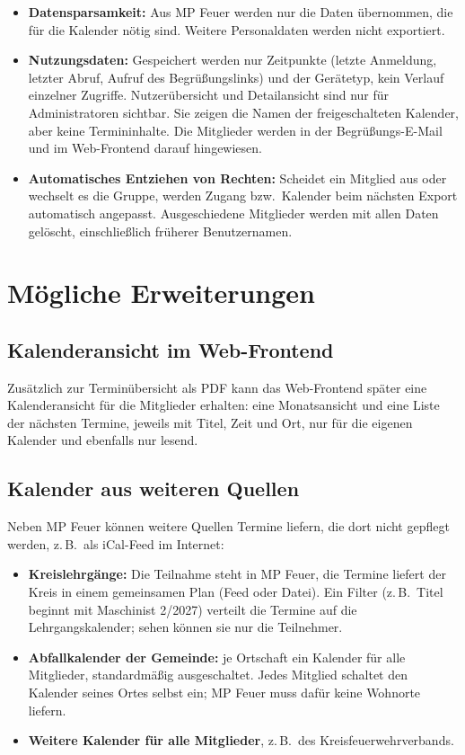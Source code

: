 \documentclass[a4paper,fontsize=10pt]{scrartcl}
\begin{document}
\begin{itemize}
  \item \textbf{Datensparsamkeit:} Aus MP Feuer werden nur die Daten
        übernommen, die für die Kalender nötig sind. Weitere
        Personaldaten werden nicht exportiert.
  \item \textbf{Nutzungsdaten:} Gespeichert werden nur Zeitpunkte (letzte
        Anmeldung, letzter Abruf, Aufruf des Begrüßungslinks) und der
        Gerätetyp, kein Verlauf einzelner Zugriffe. Nutzerübersicht und
        Detailansicht sind nur für Administratoren sichtbar. Sie zeigen die
        Namen der freigeschalteten Kalender, aber keine Termininhalte. Die Mitglieder werden in der
        Begrüßungs-E-Mail und im Web-Frontend darauf hingewiesen.
  \item \textbf{Automatisches Entziehen von Rechten:} Scheidet ein Mitglied
        aus oder wechselt es die Gruppe, werden Zugang bzw.\ Kalender beim
        nächsten Export automatisch angepasst. Ausgeschiedene Mitglieder
        werden mit allen Daten gelöscht, einschließlich früherer
        Benutzernamen.
\end{itemize}

\section{Mögliche Erweiterungen}

\subsection*{Kalenderansicht im Web-Frontend}

Zusätzlich zur Terminübersicht als PDF kann das Web-Frontend später eine
Kalenderansicht für die Mitglieder erhalten: eine Monatsansicht und eine
Liste der nächsten Termine, jeweils mit Titel, Zeit und Ort, nur für die
eigenen Kalender und ebenfalls nur lesend.

\subsection*{Kalender aus weiteren Quellen}

Neben MP Feuer können weitere Quellen Termine liefern, die dort nicht
gepflegt werden, z.\,B.\ als iCal-Feed im Internet:

\begin{itemize}
  \item \textbf{Kreislehrgänge:} Die Teilnahme steht in MP Feuer, die Termine
        liefert der Kreis in einem gemeinsamen Plan (Feed oder Datei). Ein Filter (z.\,B.\
        \glqq Titel beginnt mit Maschinist 2/2027\grqq) verteilt die Termine auf
        die Lehrgangskalender; sehen können sie nur die Teilnehmer.
  \item \textbf{Abfallkalender der Gemeinde:} je Ortschaft ein Kalender für
        alle Mitglieder, standardmäßig ausgeschaltet. Jedes Mitglied schaltet
        den Kalender seines Ortes selbst ein; MP Feuer muss dafür keine
        Wohnorte liefern.
  \item \textbf{Weitere Kalender für alle Mitglieder}, z.\,B.\ des
        Kreisfeuerwehrverbands.
\end{itemize}
\end{document}
